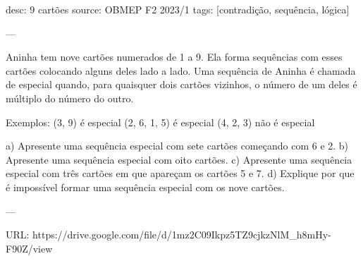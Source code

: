 desc:  $9$ cartões
source:  OBMEP F2 2023/1
tags:  [contradição, sequência, lógica]

---

Aninha tem nove cartões numerados de 1 a 9. Ela forma sequências com esses cartões colocando alguns deles lado a lado. Uma sequência de Aninha é chamada de especial quando, para quaisquer dois cartões vizinhos, o número de um deles é múltiplo do número do outro.

Exemplos:
(3, 9) é especial
(2, 6, 1, 5) é especial
(4, 2, 3) não é especial

a) Apresente uma sequência especial com sete cartões começando com 6 e 2.
b) Apresente uma sequência especial com oito cartões.
c) Apresente uma sequência especial com três cartões em que apareçam os cartões 5 e 7.
d) Explique por que é impossível formar uma sequência especial com os nove cartões.

---

URL: https://drive.google.com/file/d/1mz2C09Ikpz5TZ9cjkzNlM_h8mHy-F90Z/view

